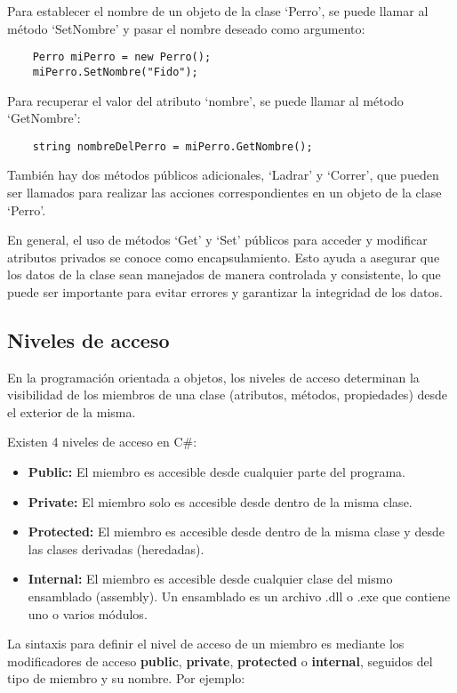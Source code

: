 \documentclass[executivepaper]{article}
\begin{document}
Para establecer el nombre de un objeto de la clase \enquote*{Perro}, se puede llamar al método \enquote*{SetNombre} y pasar el nombre deseado como argumento:
\begin{lstlisting}
    Perro miPerro = new Perro();
    miPerro.SetNombre("Fido");
\end{lstlisting}

Para recuperar el valor del atributo \enquote*{nombre}, se puede llamar al método \enquote*{GetNombre}:
\begin{lstlisting}
    string nombreDelPerro = miPerro.GetNombre();
\end{lstlisting}
También hay dos métodos públicos adicionales, \enquote*{Ladrar} y \enquote*{Correr}, que pueden ser llamados para realizar las acciones correspondientes en un objeto de la clase \enquote*{Perro}.

En general, el uso de métodos \enquote*{Get} y \enquote*{Set} públicos para acceder y modificar atributos privados se conoce como encapsulamiento. Esto ayuda a asegurar que los datos de la clase sean manejados de manera controlada y consistente, lo que puede ser importante para evitar errores y garantizar la integridad de los datos.

\subsection{Niveles de acceso}

En la programación orientada a objetos, los niveles de acceso determinan la visibilidad de los miembros de una clase (atributos, métodos, propiedades) desde el exterior de la misma.

Existen 4 niveles de acceso en C\#:

\begin{itemize}
\item \textbf{Public:} El miembro es accesible desde cualquier parte del programa.
\item \textbf{Private:} El miembro solo es accesible desde dentro de la misma clase.
\item \textbf{Protected:} El miembro es accesible desde dentro de la misma clase y desde las clases derivadas (heredadas).
\item \textbf{Internal:} El miembro es accesible desde cualquier clase del mismo ensamblado (assembly). Un ensamblado es un archivo .dll o .exe que contiene uno o varios módulos.
\end{itemize}

La sintaxis para definir el nivel de acceso de un miembro es mediante los modificadores de acceso \textbf{public}, \textbf{private}, \textbf{protected} o \textbf{internal}, seguidos del tipo de miembro y su nombre. Por ejemplo:
\end{document}
